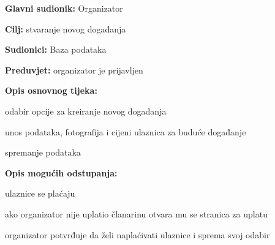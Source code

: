 					\noindent {}
					\begin{packed_item}
	
						\item \textbf{Glavni sudionik: }Organizator 
						\item  \textbf{Cilj:} stvaranje novog događanja
						\item  \textbf{Sudionici:} Baza podataka
						\item  \textbf{Preduvjet:} organizator je prijavljen
						\item  \textbf{Opis osnovnog tijeka:}
						
						\item[] \begin{packed_enum}
	
							\item odabir opcije za kreiranje novog događanja
							\item unos podataka, fotografija i cijeni ulaznica za buduće događanje
							\item spremanje podataka
						\end{packed_enum}
						
						\item  \textbf{Opis mogućih odstupanja:}
						
						\item[] \begin{packed_item}
	
							\item[2.a] ulaznice se plaćaju
							\item[] \begin{packed_enum}
								
								\item ako organizator nije uplatio članarinu otvara mu se stranica za uplatu
								\item organizator potvrđuje da želi naplaćivati ulaznice i sprema svoj odabir
								
							\end{packed_enum}
							
							
						\end{packed_item}
					\end{packed_item}
					
